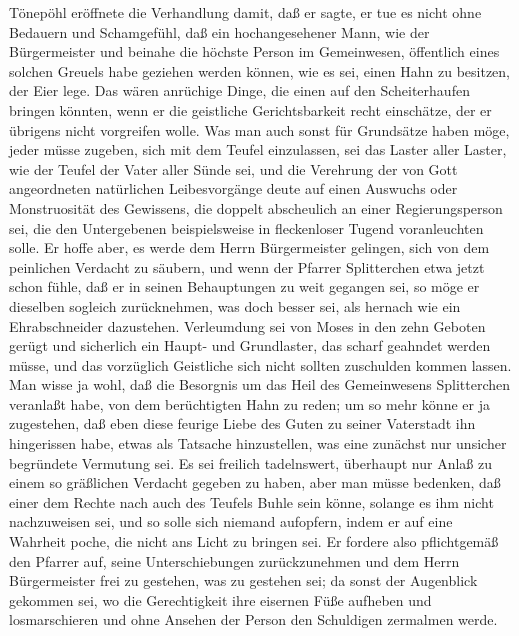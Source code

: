 Tönepöhl eröffnete die Verhandlung damit, daß er sagte, er tue es
nicht ohne Bedauern und Schamgefühl, daß ein hochangesehener Mann,
wie der Bürgermeister und beinahe die höchste Person im
Gemeinwesen, öffentlich eines solchen Greuels habe geziehen werden
können, wie es sei, einen Hahn zu besitzen, der Eier lege. Das
wären anrüchige Dinge, die einen auf den Scheiterhaufen bringen
könnten, wenn er die geistliche Gerichtsbarkeit recht einschätze,
der er übrigens nicht vorgreifen wolle. Was man auch sonst für
Grundsätze haben möge, jeder müsse zugeben, sich mit dem Teufel
einzulassen, sei das Laster aller Laster, wie der Teufel
\pagenum{[24]}der Vater aller Sünde sei, und die Verehrung der von
Gott angeordneten natürlichen Leibesvorgänge deute auf einen
Auswuchs oder Monstruosität des Gewissens, die doppelt abscheulich
an einer Regierungsperson sei, die den Untergebenen beispielsweise
in fleckenloser Tugend voranleuchten solle. Er hoffe aber, es werde
dem Herrn Bürgermeister gelingen, sich von dem peinlichen Verdacht
zu säubern, und wenn der Pfarrer Splitterchen etwa jetzt schon
fühle, daß er in seinen Behauptungen zu weit gegangen sei, so möge
er dieselben sogleich zurücknehmen, was doch besser sei, als
hernach wie ein Ehrabschneider dazustehen. Verleumdung sei von
Moses in den zehn Geboten gerügt und sicherlich ein Haupt- und
Grundlaster, das scharf geahndet werden müsse, und das vorzüglich
Geistliche sich nicht sollten zuschulden kommen lassen. Man wisse
ja wohl, daß die Besorgnis um das Heil des Gemeinwesens
Splitterchen veranlaßt habe, von dem berüchtigten Hahn zu reden; um
so mehr könne er ja zugestehen, daß eben diese feurige Liebe des
Guten zu seiner Vaterstadt ihn hingerissen habe, etwas als Tatsache
hinzustellen, was eine zunächst nur unsicher begründete Vermutung
sei. Es sei freilich tadelnswert, überhaupt nur Anlaß zu einem so
gräßlichen Verdacht gegeben zu haben, aber man müsse bedenken, daß
einer dem Rechte nach auch des Teufels Buhle sein könne, solange es
ihm nicht nachzuweisen sei, und so solle sich niemand aufopfern,
indem er auf eine Wahrheit poche, die nicht ans Licht zu bringen
sei. Er fordere also pflichtgemäß den Pfarrer auf, seine
Unterschiebungen zurückzunehmen und dem Herrn Bürgermeister frei zu
gestehen, was zu gestehen sei; da sonst der Augenblick gekommen
sei, wo die Gerechtigkeit ihre eisernen Füße aufheben und
losmarschieren\pagenum{[25]} und ohne Ansehen der Person den
Schuldigen zermalmen werde.

